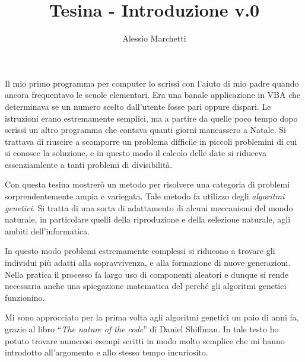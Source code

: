 \documentclass[a4paper, 11pt]{article}
\title{\myfont Tesina - Introduzione v.0}
\author{Alessio Marchetti}
\date{}
\begin{document}
\maketitle

Il mio primo programma per computer lo scrissi con l'aiuto di mio padre quando
ancora frequentavo le scuole elementari. Era una banale applicazione in VBA
che determinava se un numero scelto dall'utente fosse pari oppure dispari. Le
istruzioni erano estremamente semplici, ma a partire da quelle poco tempo dopo 
scrissi un altro programma che contava quanti giorni mancassero a Natale. Si
trattava di riuscire a scomporre un problema difficile in piccoli problemini di
cui si conosce la soluzione, e in questo modo il calcolo delle date si riduceva
essenziamlente a tanti problemi di divisibilit\`a.

Con questa tesina mostrer\`o un metodo per risolvere una categoria di problemi
sorprendentemente ampia e variegata. Tale metodo fa utilizzo degli
\textit{algoritmi genetici}. Si tratta di una sorta di adattamento di alcuni
meccanismi del mondo naturale, in particolare quelli della riproduzione e della
selezione naturale, agli ambiti dell'informatica. 

In questo modo problemi estremamente complessi si riducono a trovare gli
individui pi\`u adatti alla sopravvivenza, e alla formazione di nuove
generazioni. Nella pratica il processo fa largo uso di componenti aleatori e
dunque si rende necessaria anche una spiegazione matematica del perch\'e gli
algoritmi genetici funzionino. 

Mi sono approcciato per la prima volta agli algoritmi genetici un paio di anni
fa, grazie al libro ``\textit{The nature of the code}'' di Daniel Shiffman. In
tale testo ho potuto trovare numerosi esempi scritti in modo molto semplice che
mi hanno introdotto all'argomento e allo stesso tempo incuriosito. 
\end{document}
